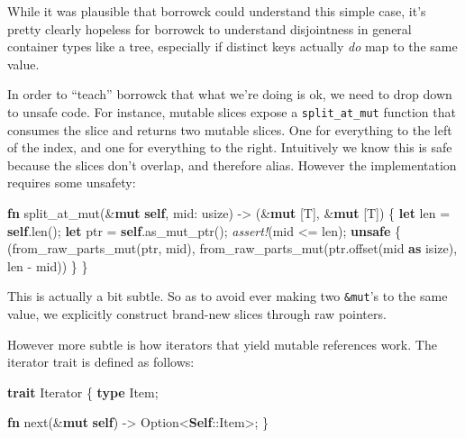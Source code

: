 \documentclass[a4paper,]{book}
\newenvironment{Shaded}{\begin{snugshade}}{\end{snugshade}}
\newcommand{\KeywordTok}[1]{\textcolor[rgb]{0.13,0.29,0.53}{\textbf{{#1}}}}
\newcommand{\DataTypeTok}[1]{\textcolor[rgb]{0.13,0.29,0.53}{{#1}}}
\newcommand{\BuiltInTok}[1]{{#1}}
\newcommand{\PreprocessorTok}[1]{\textcolor[rgb]{0.56,0.35,0.01}{\textit{{#1}}}}
\newcommand{\NormalTok}[1]{{#1}}
\begin{document}
While it was plausible that borrowck could understand this simple case,
it's pretty clearly hopeless for borrowck to understand disjointness in
general container types like a tree, especially if distinct keys
actually \emph{do} map to the same value.

In order to ``teach'' borrowck that what we're doing is ok, we need to
drop down to unsafe code. For instance, mutable slices expose a
\texttt{split\_at\_mut} function that consumes the slice and returns two
mutable slices. One for everything to the left of the index, and one for
everything to the right. Intuitively we know this is safe because the
slices don't overlap, and therefore alias. However the implementation
requires some unsafety:

\begin{Shaded}
\begin{Highlighting}[]
\KeywordTok{fn} \NormalTok{split_at_mut(&}\KeywordTok{mut} \KeywordTok{self}\NormalTok{, mid: }\DataTypeTok{usize}\NormalTok{) -> (&}\KeywordTok{mut} \NormalTok{[T], &}\KeywordTok{mut} \NormalTok{[T]) \{}
    \KeywordTok{let} \NormalTok{len = }\KeywordTok{self}\NormalTok{.len();}
    \KeywordTok{let} \NormalTok{ptr = }\KeywordTok{self}\NormalTok{.as_mut_ptr();}
    \PreprocessorTok{assert!}\NormalTok{(mid <= len);}
    \KeywordTok{unsafe} \NormalTok{\{}
        \NormalTok{(from_raw_parts_mut(ptr, mid),}
         \NormalTok{from_raw_parts_mut(ptr.offset(mid }\KeywordTok{as} \DataTypeTok{isize}\NormalTok{), len - mid))}
    \NormalTok{\}}
\NormalTok{\}}
\end{Highlighting}
\end{Shaded}

This is actually a bit subtle. So as to avoid ever making two
\texttt{\&mut}'s to the same value, we explicitly construct brand-new
slices through raw pointers.

However more subtle is how iterators that yield mutable references work.
The iterator trait is defined as follows:

\begin{Shaded}
\begin{Highlighting}[]
\KeywordTok{trait} \BuiltInTok{Iterator} \NormalTok{\{}
    \KeywordTok{type} \NormalTok{Item;}

    \KeywordTok{fn} \NormalTok{next(&}\KeywordTok{mut} \KeywordTok{self}\NormalTok{) -> }\DataTypeTok{Option}\NormalTok{<}\KeywordTok{Self}\NormalTok{::Item>;}
\NormalTok{\}}
\end{Highlighting}
\end{Shaded}
\end{document}
